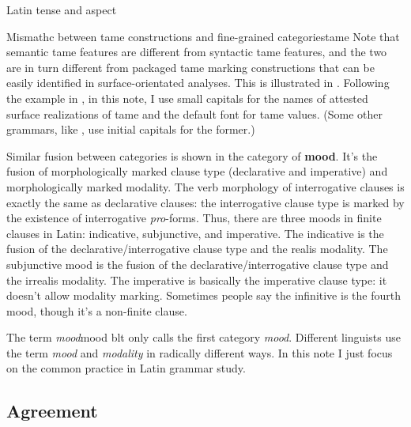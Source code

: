 \documentclass[a4paper, oneside]{report}
\newcommand*{\concept}[1]{\textbf{#1}}
\newcommand*{\term}[1]{\emph{#1}}
\begin{document}
\begin{table}[H]
    \caption{Latin tense and aspect}
    \label{tbl:latin-tense-aspect}
    \centering
        
\end{table}

\begin{infobox}{Mismathc between \ac{tame} constructions and fine-grained categories}{tame}
    Note that semantic \ac{tame} features are different from 
    syntactic \ac{tame} features,
    and the two are in turn different from packaged \ac{tame} marking constructions
    that can be easily identified in surface-orientated analyses.
    This is illustrated in .
    Following the example in \citet{grimm2021grammar},
    in this note, I use small capitals for the names of attested surface realizations of \ac{tame}
    and the default font for \ac{tame} values.
    (Some other grammars, like \citet{jacques2021grammar,friesen2017grammar}, 
    use initial capitals for the former.)
\end{infobox}

Similar fusion between categories is shown in the category of \concept{mood}.
It's the fusion of morphologically marked clause type 
(declarative and imperative)
and morphologically marked modality.
The verb morphology of interrogative clauses is exactly the same as declarative clauses:
the interrogative clause type is marked by the existence of interrogative \term{pro}-forms.
Thus, there are three moods in finite clauses in Latin:
\acl{indicative}, \acl{subjunctive}, and \acl{imperative}.
The \acl{indicative} is the fusion of 
the declarative/interrogative clause type and the realis modality.
The \acl{subjunctive} mood is the fusion of 
the declarative/interrogative clause type and the irrealis modality.
The \acl{imperative} is basically the imperative clause type:
it doesn't allow modality marking.
Sometimes people say the infinitive is the fourth mood,
though it's a non-finite clause.

\begin{infobox}{The term \term{mood}}{mood}
    \acs{blt} only calls the first category \term{mood}.
    Different linguists use the term \term{mood} and \term{modality} in radically different ways.
    In this note I just focus on the common practice in Latin grammar study.
\end{infobox}

\subsection{Agreement}\label{sec:agreement-abs}
\end{document}
